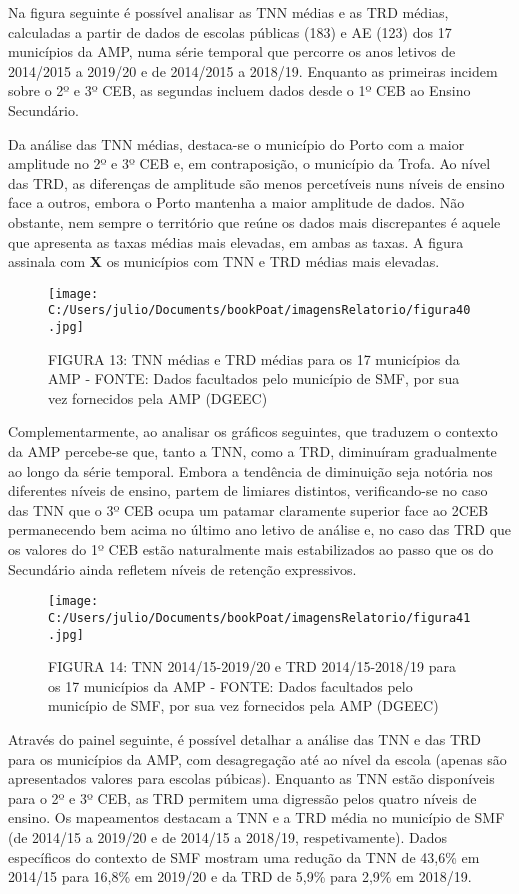 \documentclass[
]{book}
\begin{document}
Na figura seguinte é possível analisar as TNN médias e as TRD médias, calculadas a partir de dados de escolas públicas (183) e AE (123) dos 17 municípios da AMP, numa série temporal que percorre os anos letivos de 2014/2015 a 2019/20 e de 2014/2015 a 2018/19. Enquanto as primeiras incidem sobre o 2º e 3º CEB, as segundas incluem dados desde o 1º CEB ao Ensino Secundário.

Da análise das TNN médias, destaca-se o município do Porto com a maior amplitude no 2º e 3º CEB e, em contraposição, o município da Trofa. Ao nível das TRD, as diferenças de amplitude são menos percetíveis nuns níveis de ensino face a outros, embora o Porto mantenha a maior amplitude de dados. Não obstante, nem sempre o território que reúne os dados mais discrepantes é aquele que apresenta as taxas médias mais elevadas, em ambas as taxas. A figura assinala com \textbf{X} os municípios com TNN e TRD médias mais elevadas.

\begin{figure}
\centering
\texttt{[image: C:/Users/julio/Documents/bookPoat/imagensRelatorio/figura40.jpg]}
\caption{FIGURA 13: TNN médias e TRD médias para os 17 municípios da AMP - FONTE: Dados facultados pelo município de SMF, por sua vez fornecidos pela AMP (DGEEC)}
\end{figure}

Complementarmente, ao analisar os gráficos seguintes, que traduzem o contexto da AMP percebe-se que, tanto a TNN, como a TRD, diminuíram gradualmente ao longo da série temporal. Embora a tendência de diminuição seja notória nos diferentes níveis de ensino, partem de limiares distintos, verificando-se no caso das TNN que o 3º CEB ocupa um patamar claramente superior face ao 2CEB permanecendo bem acima no último ano letivo de análise e, no caso das TRD que os valores do 1º CEB estão naturalmente mais estabilizados ao passo que os do Secundário ainda refletem níveis de retenção expressivos.

\begin{figure}
\centering
\texttt{[image: C:/Users/julio/Documents/bookPoat/imagensRelatorio/figura41.jpg]}
\caption{FIGURA 14: TNN 2014/15-2019/20 e TRD 2014/15-2018/19 para os 17 municípios da AMP - FONTE: Dados facultados pelo município de SMF, por sua vez fornecidos pela AMP (DGEEC)}
\end{figure}

Através do painel seguinte, é possível detalhar a análise das TNN e das TRD para os municípios da AMP, com desagregação até ao nível da escola (apenas são apresentados valores para escolas púbicas). Enquanto as TNN estão disponíveis para o 2º e 3º CEB, as TRD permitem uma digressão pelos quatro níveis de ensino. Os mapeamentos destacam a TNN e a TRD média no município de SMF (de 2014/15 a 2019/20 e de 2014/15 a 2018/19, respetivamente). Dados específicos do contexto de SMF mostram uma redução da TNN de 43,6\% em 2014/15 para 16,8\% em 2019/20 e da TRD de 5,9\% para 2,9\% em 2018/19.
\end{document}
